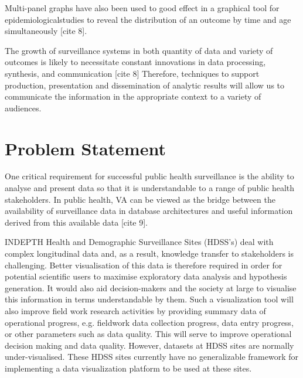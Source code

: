 Multi-panel graphs have also been used to good effect in a graphical tool for epidemiologicalstudies to reveal the distribution of an outcome by time and age simultaneously [cite 8].

The growth of surveillance systems in both quantity of data and variety of outcomes is likely to necessitate constant innovations in data processing, synthesis, and communication [cite 8]
Therefore, techniques to support production, presentation and dissemination of analytic results will allow us to communicate the information in the appropriate context to a variety of audiences.


%
%    


\section{Problem Statement}
One critical requirement for successful public health surveillance is the ability to analyse and present data so that it is understandable to a range of public health stakeholders. In public health, VA can be viewed as the bridge between the availability of surveillance data in database architectures and useful information derived from this available data [cite 9].

INDEPTH Health and Demographic Surveillance Sites (HDSS's) deal with complex longitudinal data and, as a result, knowledge transfer to stakeholders is challenging. Better visualisation of this data is therefore required in order for potential scientific users to maximise exploratory data analysis and hypothesis generation. It would also aid decision-makers and the society at large to visualise this information in terms understandable by them. Such a visualization tool will also improve field work research activities by providing summary data of operational progress, e.g. fieldwork data collection progress, data entry progress, or other parameters such as data quality. This will serve to improve operational decision making and data quality. However, datasets at HDSS sites are normally under-visualised. These HDSS sites currently have no generalizable framework for implementing a data visualization platform to be used at these sites.

